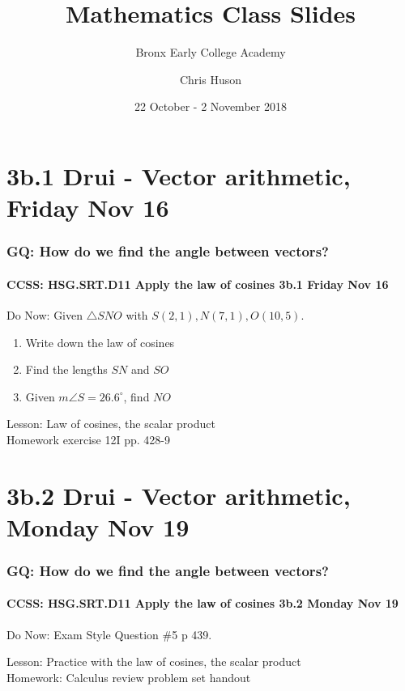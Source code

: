 \documentclass{beamer}
\title{Mathematics Class Slides}
\subtitle{Bronx Early College Academy}
\author{Chris Huson}
\date{22 October - 2 November 2018}
\begin{document}
\frame{\titlepage}

\section[Outline]{}
\frame{\tableofcontents}


\section{3b.1 Drui - Vector arithmetic, Friday Nov 16}
  \frame
  {
    \frametitle{GQ: How do we find the angle between vectors?}
    \framesubtitle{CCSS: HSG.SRT.D11 Apply the law of cosines \qquad \alert{3b.1 Friday Nov 16}}

    \begin{block}{Do Now: Given $\triangle SNO$ with $S(2,1),N(7,1),O(10,5)$.}
    \begin{enumerate}
        \item Write down the law of cosines
        \item Find the lengths $SN$ and $SO$
        \item Given $m\angle S=26.6^\circ$, find $NO$
    \end{enumerate}
    \end{block}

    Lesson: Law of cosines, the scalar product\\
    Homework exercise 12I pp. 428-9
  }


  \section{3b.2 Drui - Vector arithmetic, Monday Nov 19}
    \frame
    {
      \frametitle{GQ: How do we find the angle between vectors?}
      \framesubtitle{CCSS: HSG.SRT.D11 Apply the law of cosines \qquad \alert{3b.2 Monday Nov 19}}

      \begin{block}{Do Now: Exam Style Question \#5 p 439.}
      \end{block}

      Lesson: Practice with the law of cosines, the scalar product\\
      Homework: Calculus review problem set handout
    }
\end{document}
